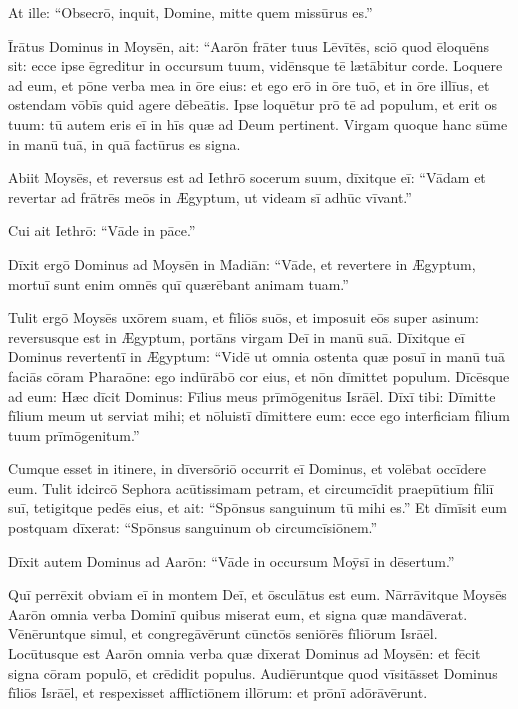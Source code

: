 At ille: ``Obsecrō, inquit, Domine,
mitte quem missūrus es.''

Īrātus Dominus in Moysēn, ait: ``Aarōn frāter tuus Lēvītēs,
sciō quod ēloquēns sit: ecce ipse ēgreditur in occursum tuum,
vidēnsque tē lætābitur corde.
Loquere ad eum, et pōne verba mea in ōre eius:
et ego erō in ōre tuō, et in ōre illīus,
et ostendam vōbīs quid agere dēbeātis.
Ipse loquētur prō tē ad populum,
et erit os tuum:
tū autem eris eī in hīs quæ ad Deum pertinent.
Virgam quoque hanc sūme in manū tuā,
in quā factūrus es signa.

Abiit Moysēs, et reversus est ad Iethrō socerum suum,
dīxitque eī: ``Vādam et revertar ad frātrēs meōs in Ægyptum,
ut videam sī adhūc vīvant.''

Cui ait Iethrō: ``Vāde in pāce.''

Dīxit ergō Dominus ad Moysēn in Madiān: ``Vāde, et revertere in Ægyptum,
mortuī sunt enim omnēs quī quærēbant animam tuam.''

Tulit ergō Moysēs uxōrem suam, et fīliōs suōs,
et imposuit eōs super asinum: reversusque est in Ægyptum,
portāns virgam Deī in manū suā. Dīxitque eī Dominus revertentī
in Ægyptum: ``Vidē ut omnia ostenta quæ posuī in manū tuā
faciās cōram Pharaōne: ego indūrābō cor eius,
et nōn dīmittet populum. Dīcēsque ad eum: Hæc
dīcit Dominus: Fīlius meus prīmōgenitus Isrāēl.
Dīxī tibi: Dīmitte fīlium meum ut serviat mihi;
et nōluistī dīmittere eum:
ecce ego interficiam fīlium tuum prīmōgenitum.''

Cumque esset in itinere, in dīversōriō
occurrit eī Dominus, et volēbat occīdere eum. 
Tulit idcircō Sephora acūtissimam petram,
et circumcīdit praepūtium fīliī suī, tetigitque pedēs eius,
et ait: ``Spōnsus sanguinum tū mihi es.''
Et dīmīsit eum postquam dīxerat: ``Spōnsus sanguinum ob circumcīsiōnem.''

Dīxit autem Dominus ad Aarōn: ``Vāde in occursum Moȳsī
in dēsertum.'' 

Quī perrēxit obviam eī in montem Deī, et ōsculātus est eum.
Nārrāvitque Moysēs Aarōn omnia verba Dominī quibus miserat eum,
et signa quæ mandāverat. Vēnērunt\-que simul, et congregāvērunt
cūnctōs seniōrēs fīliōrum Isrāēl.
Locūtusque est Aarōn omnia verba quæ dīxerat Dominus ad Moysēn: et
fēcit signa cōram populō, et crēdidit populus.
Audiēruntque quod vīsitāsset Dominus fīliōs Isrāēl,
et respexisset afflīctiōnem illōrum: et prōnī adōrāvērunt.
